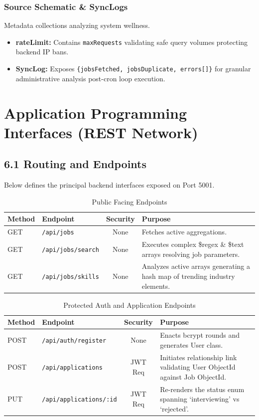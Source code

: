 \documentclass[12pt,a4paper,oneside]{report}
\begin{document}
\subsection{Source Schematic \& SyncLogs}
Metadata collections analyzing system wellness.
\begin{itemize}
    \item \textbf{rateLimit:} Contains \texttt{maxRequests} validating safe query volumes protecting backend IP bans.
    \item \textbf{SyncLog:} Exposes \texttt{\{jobsFetched, jobsDuplicate, errors[]\}} for granular administrative analysis post-cron loop execution.
\end{itemize}

\chapter{Application Programming Interfaces (REST Network)}

\section{6.1 Routing and Endpoints}
Below defines the principal backend interfaces exposed on Port 5001.

\begin{table}[H]
\centering
\caption{Public Facing Endpoints}
\renewcommand{\arraystretch}{1.5}
\begin{tabularx}{\textwidth}{|l|l|c|X|}
\hline
\textbf{Method} & \textbf{Endpoint} & \textbf{Security} & \textbf{Purpose} \\ 
\hline
GET & \texttt{/api/jobs} & None & Fetches active aggregations. \\
\hline
GET & \texttt{/api/jobs/search} & None & Executes complex \$regex \& \$text arrays resolving job parameters. \\
\hline
GET & \texttt{/api/jobs/skills} & None & Analyzes active arrays generating a hash map of trending industry elements.\\
\hline
\end{tabularx}
\end{table}

\begin{table}[H]
\centering
\caption{Protected Auth and Application Endpoints}
\renewcommand{\arraystretch}{1.5}
\begin{tabularx}{\textwidth}{|l|l|c|X|}
\hline
\textbf{Method} & \textbf{Endpoint} & \textbf{Security} & \textbf{Purpose} \\ 
\hline
POST & \texttt{/api/auth/register} & None & Enacts bcrypt rounds and generates User class. \\
\hline
POST & \texttt{/api/applications} & JWT Req & Initiates relationship link validating User ObjectId against Job ObjectId.\\
\hline
PUT & \texttt{/api/applications/:id} & JWT Req & Re-renders the status enum spanning `interviewing' vs `rejected'.\\
\hline
\end{tabularx}
\end{table}
\end{document}
